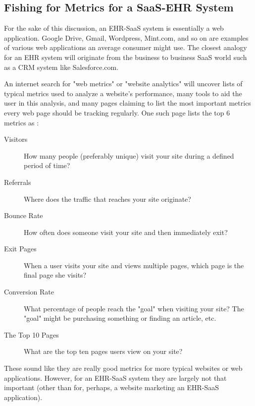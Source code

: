 \documentclass[10pt]{article}
\begin{document}
\subsection{Fishing for Metrics for a SaaS-EHR System}
\label{sec:EHR-SaaS-Metrics}


For the sake of this discussion, an EHR-SaaS system is essentially a web application.
Google Drive, Gmail, Wordpress, Mint.com, and so on are examples of various web applications an average consumer might use.
The closest analogy for an EHR system will originate from the business to business SaaS world such as a CRM system like Salesforce.com.

An internet search for "web metrics" or "website analytics" will uncover lists of typical metrics used to analyze a website's performance, many tools to aid the user in this analysis, and many pages claiming to list the most important metrics every web page should be tracking regularly.
One such page lists the top 6 metrics as \cite{top-6-metrics}:
\begin{description}
	\item[Visitors] How many people (preferably unique) visit your site during a defined period of time?
	\item[Referrals] Where does the traffic that reaches your site originate?
	\item[Bounce Rate] How often does someone visit your site and then immediately exit?
	\item[Exit Pages] When a user visits your site and views multiple pages, which page is the final page she visits?
	\item[Conversion Rate] What percentage of people reach the "goal" when visiting your site? The "goal" might be purchasing something or finding an article, etc.
	\item[The Top 10 Pages] What are the top ten pages users view on your site?
\end{description}

These sound like they are really good metrics for more typical websites or web applications.
However, for an EHR-SaaS system they are largely not that important (other than for, perhaps, a website marketing an EHR-SaaS application).
\end{document}
